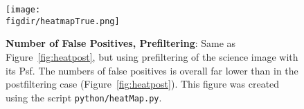 \documentclass[prd, nofootinbib, floatfix, 11pt, tightenlines, times]{article}
\def\figdir{../figures}
\begin{document}
\begin{figure}[h!]
  \centering
  \texttt{[image: \\figdir/heatmapTrue.png]}
  \caption{{\bf Number of False Positives, Prefiltering}: Same as
    Figure~\ref{fig:heatpost}, but using prefiltering of the science
    image with its Psf.  The numbers of false positives is overall far
    lower than in the postfiltering case (Figure~\ref{fig:heatpost}).
    This figure was created using the script {\tt python/heatMap.py}.}
  \label{fig:heatpre}
\end{figure}

\clearpage



\clearpage
\begin{appendices}
\end{appendices}
\end{document}
